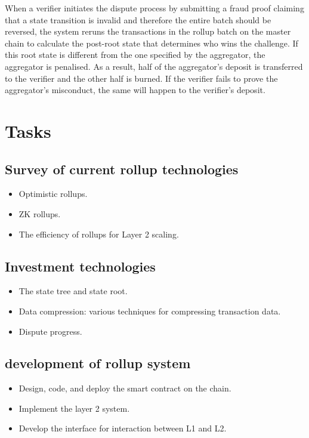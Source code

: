 \documentclass{article}
\begin{document}
When a verifier initiates the dispute process by submitting a fraud proof claiming that a state transition is invalid and therefore the entire batch should be reversed, the system reruns the transactions in the rollup batch on the master chain to calculate the post-root state that determines who wins the challenge. If this root state is different from the one specified by the aggregator, the aggregator is penalised. As a result, half of the aggregator's deposit is transferred to the verifier and the other half is burned. If the verifier  fails to prove the aggregator's misconduct, the same will happen to the verifier's deposit.

\section{Tasks}
\subsection{Survey of current rollup technologies}
\begin{itemize} 
\item Optimistic rollups. 
\item ZK rollups. 
\item The efficiency of rollups for Layer 2 scaling.
\end{itemize}
\subsection{Investment technologies}
\begin{itemize} 
\item The state tree and state root. 
\item Data compression: various techniques for compressing transaction data. 
\item Dispute progress.
\end{itemize}
\subsection{development of rollup system}
\begin{itemize} 
\item Design, code, and deploy the smart contract on the chain. 
\item Implement the layer 2 system. 
\item Develop the interface for interaction between L1 and L2.
\end{itemize}
\end{document}
